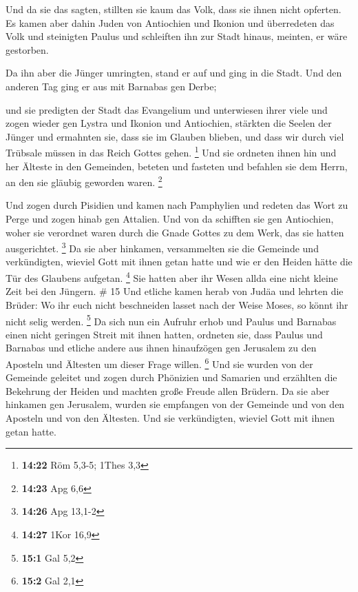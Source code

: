  Und da sie das sagten, stillten sie kaum das Volk, dass
sie ihnen nicht opferten.  Es kamen aber dahin Juden von
Antiochien und Ikonion und überredeten das Volk und steinigten Paulus
und schleiften ihn zur Stadt hinaus, meinten, er wäre gestorben.

 Da ihn aber die Jünger umringten, stand er auf und ging
in die Stadt. Und den anderen Tag ging er aus mit Barnabas gen Derbe;

 und sie predigten der Stadt das Evangelium und
unterwiesen ihrer viele und zogen wieder gen Lystra und Ikonion und
Antiochien,  stärkten die Seelen der Jünger und ermahnten
sie, dass sie im Glauben blieben, und dass wir durch viel Trübsale
müssen in das Reich Gottes gehen. \footnote{\textbf{14:22} Röm 5,3-5;
  1Thes 3,3}  Und sie ordneten ihnen hin und her Älteste
in den Gemeinden, beteten und fasteten und befahlen sie dem Herrn, an
den sie gläubig geworden waren. \footnote{\textbf{14:23} Apg 6,6}

 Und zogen durch Pisidien und kamen nach Pamphylien
 und redeten das Wort zu Perge und zogen hinab gen
Attalien.  Und von da schifften sie gen Antiochien, woher
sie verordnet waren durch die Gnade Gottes zu dem Werk, das sie hatten
ausgerichtet. \footnote{\textbf{14:26} Apg 13,1-2}  Da
sie aber hinkamen, versammelten sie die Gemeinde und verkündigten,
wieviel Gott mit ihnen getan hatte und wie er den Heiden hätte die Tür
des Glaubens aufgetan. \footnote{\textbf{14:27} 1Kor 16,9}
 Sie hatten aber ihr Wesen allda eine nicht kleine Zeit
bei den Jüngern. \# 15  Und etliche kamen herab von Judäa
und lehrten die Brüder: Wo ihr euch nicht beschneiden lasset nach der
Weise Moses, so könnt ihr nicht selig werden. \footnote{\textbf{15:1}
  Gal 5,2}  Da sich nun ein Aufruhr erhob und Paulus und
Barnabas einen nicht geringen Streit mit ihnen hatten, ordneten sie,
dass Paulus und Barnabas und etliche andere aus ihnen hinaufzögen gen
Jerusalem zu den Aposteln und Ältesten um dieser Frage willen.
\footnote{\textbf{15:2} Gal 2,1}  Und sie wurden von der
Gemeinde geleitet und zogen durch Phönizien und Samarien und erzählten
die Bekehrung der Heiden und machten große Freude allen Brüdern.
 Da sie aber hinkamen gen Jerusalem, wurden sie empfangen
von der Gemeinde und von den Aposteln und von den Ältesten. Und sie
verkündigten, wieviel Gott mit ihnen getan hatte.


